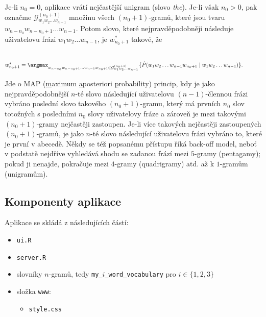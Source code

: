 Je-li $n_{0} = 0$, aplikace vrátí nejčastější unigram (slovo \textit{the}). Je-li však $n_{0} > 0$, pak označme $\mathcal{G}_{w_{1}w_{2} \ldots w_{n - 1}}^{(n_{0} + 1)}$ množinu všech $(n_{0} + 1)$-gramů, které jsou tvaru $w_{n - n_{0}}w_{n - n_{0} + 1} \ldots w_{n - 1}$. Potom slovo, které nejpravděpodobněji následuje uživatelovu frázi $w_{1}w_{2} \ldots w_{n - 1}$, je $w_{n_{0} + 1}^{*}$ takové, že

\vspace{-1.5cm}
\begin{align*}
  \phantom{n_{0}} &\phantom{= \argmax_{i \in \{ 0, 1, \ldots, n - 1 \}} \{i : (\exists (i + 1)\text{-gram} = v_{1}v_{2} \ldots v_{i + 1} \in \mathcal{G})(\forall j \in \{1, 2, \ldots, i\})(v_{j} = w_{n - i + j - 1}) \}.} \\
  w_{n_{0} + 1}^{*} &= \argmax_{w_{n - n_{0}}w_{n - n_{0} + 1} \ldots w_{n - 1}w_{n_{0} + 1} \in \mathcal{G}_{w_{1}w_{2} \ldots w_{n - 1}}^{(n_{0} + 1)}} \{ \hat{P}(w_{1}w_{2} \ldots w_{n - 1}w_{n_{0} + 1} \mid w_{1}w_{2} \ldots w_{n - 1}) \}.
\end{align*}

Jde o MAP (\underline{m}aximum \underline{a}posteriori \underline{p}robability) princip, kdy je jako nejpravděpodobnější $n$-té slovo následující uživatelovu $(n - 1)$-člennou frázi vybráno poslední slovo takového $(n_{0} + 1)$-gramu, který má prvních $n_{0}$ slov totožných s posledními $n_{0}$ slovy uživatelovy fráze a zároveň je mezi takovými $(n_{0} + 1)$-gramy nejčastěji zastoupen. Je-li více takových nejčastěji zastoupených $(n_{0} + 1)$-gramů, je jako $n$-té slovo následující uživatelovu frázi vybráno to, které je první v abecedě. Někdy se též popsanému přístupu říká back-off model, neboť v podstatě nejdříve vyhledává shodu se zadanou frází mezi $5$-gramy (pentagamy); pokud ji nenajde, pokračuje mezi $4$-gramy (quadrigramy) atd. až k $1$-gramům (unigramům).



\subsection{Komponenty aplikace}

Aplikace se skládá z následujících částí:

\begin{itemize}
  \item \texttt{ui.R}
  \item \texttt{server.R}
  \item slovníky $n$-gramů, tedy \texttt{my\_$i$\_word\_vocabulary} pro $i \in \{1, 2, 3\}$
  \item složka \texttt{www}:
  \begin{itemize}
    \item \texttt{style.css}
  \end{itemize}
\end{itemize}


